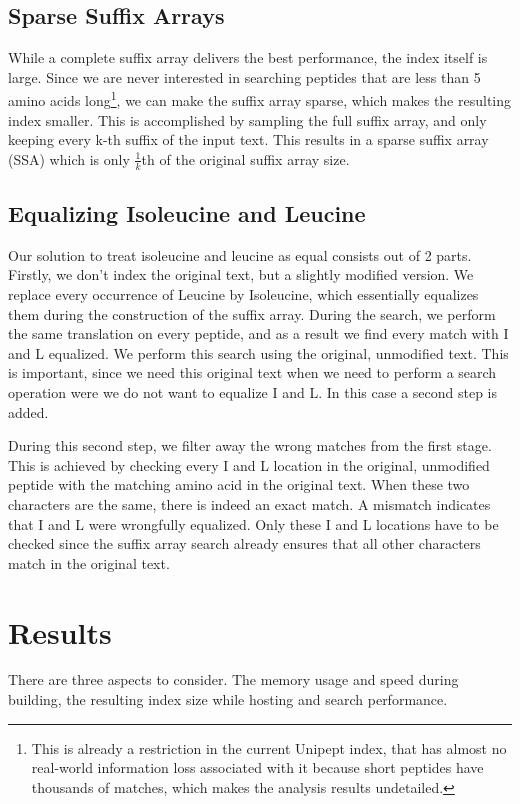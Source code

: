 \documentclass[10pt]{article}
\begin{document}
\begin{multicols}{2}
        \subsection{Sparse Suffix Arrays}
        While a complete suffix array delivers the best performance, the index itself is large.
        Since we are never interested in searching peptides that are less than 5 amino acids long\footnote{This is already a restriction in the current Unipept index, that has almost no real-world information loss associated with it because short peptides have thousands of matches, which makes the analysis results undetailed.}, we can make the suffix array sparse, which makes the resulting index smaller.
        This is accomplished by sampling the full suffix array, and only keeping every k-th suffix of the input text.
        This results in a sparse suffix array (SSA) which is only $\frac{1}{k}$th of the original suffix array size.

        \subsection{Equalizing Isoleucine and Leucine}
        Our solution to treat isoleucine and leucine as equal consists out of 2 parts.
        Firstly, we don't index the original text, but a slightly modified version.
        We replace every occurrence of Leucine by Isoleucine, which essentially equalizes them during the construction of the suffix array.
        During the search, we perform the same translation on every peptide, and as a result we find every match with I and L equalized.
        We perform this search using the original, unmodified text.
        This is important, since we need this original text when we need to perform a search operation were we do not want to equalize I and L\@.
        In this case a second step is added.

        During this second step, we filter away the wrong matches from the first stage.
        This is achieved by checking every I and L location in the original, unmodified peptide with the matching amino acid in the original text.
        When these two characters are the same, there is indeed an exact match.
        A mismatch indicates that I and L were wrongfully equalized.
        Only these I and L locations have to be checked since the suffix array search already ensures that all other characters match in the original text.


        \section{Results}\label{sec:results} %
        There are three aspects to consider.
        The memory usage and speed during building, the resulting index size while hosting and search performance.


\end{multicols}
\end{document}
